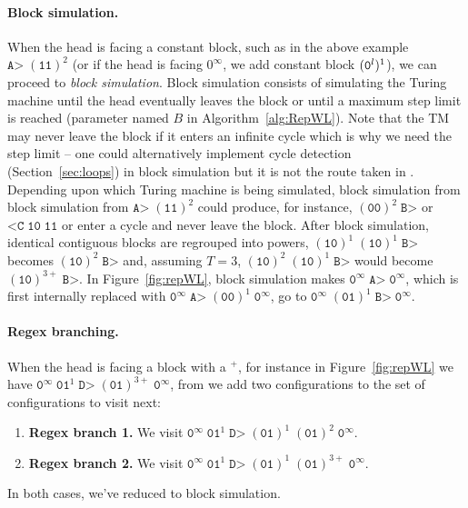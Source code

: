 \paragraph{Block simulation.} When the head is facing a constant block, such as in the above example $\texttt{A>} \; (\texttt{11})^2$ (or if the head is facing $0^\infty$, we add constant block $(\texttt{0}^l)^1$), we can proceed to \textit{block simulation}.
Block simulation consists of simulating the Turing machine until the head eventually leaves the block or until a maximum step limit is reached (parameter named $B$ in Algorithm~\ref{alg:RepWL}). Note that the TM may never leave the block if it enters an infinite cycle which is why we need the step limit -- one could alternatively implement cycle detection (Section~\ref{sec:loops}) in block simulation but it is not the route taken in \CoqBB. Depending upon which Turing machine is being simulated, block simulation from block simulation from $\texttt{A>} \; (\texttt{11})^2$ could produce, for instance, $(\texttt{00})^2 \; \texttt{B>}$ or $\texttt{<C} \; \texttt{10} \; \texttt{11} $ or enter a cycle and never leave the block. After block simulation, identical contiguous blocks are regrouped into powers, \eg $(\texttt{10})^1 \; (\texttt{10})^1 \; \texttt{B>}$ becomes $(\texttt{10})^2 \; \texttt{B>}$ and, assuming $T=3$, $(\texttt{10})^2\; (\texttt{10})^1\; \texttt{B>}$ would become $(\texttt{10})^{3+}\; \texttt{B>}$. In Figure~\ref{fig:repWL}, block simulation makes $\texttt{0}^\infty \; \texttt{A>} \; \texttt{0}^\infty$, which is first internally replaced with $\texttt{0}^\infty \; \texttt{A>} \; (\texttt{00})^1 \; \texttt{0}^\infty$, go to $\texttt{0}^\infty \; (\texttt{01})^1 \; \texttt{B>} \; \texttt{0}^\infty$.

\paragraph{Regex branching.} When the head is facing a block with a $^+$, for instance in Figure~\ref{fig:repWL} we have $\texttt{0}^\infty \; \texttt{01}^1 \; \texttt{D>} \; (\texttt{01})^{3+} \; \texttt{0}^\infty$, from we add two configurations to the set of configurations to visit next:
\begin{enumerate}
    \item \textbf{Regex branch 1.} We visit $\texttt{0}^\infty \; \texttt{01}^1 \; \texttt{D>} \; (\texttt{01})^1 \; (\texttt{01})^{2} \; \texttt{0}^\infty$.
    \item \textbf{Regex branch 2.} We visit $\texttt{0}^\infty \; \texttt{01}^1 \; \texttt{D>} \; (\texttt{01})^1 \; (\texttt{01})^{3+} \; \texttt{0}^\infty$.
\end{enumerate}
In both cases, we've reduced to block simulation.

